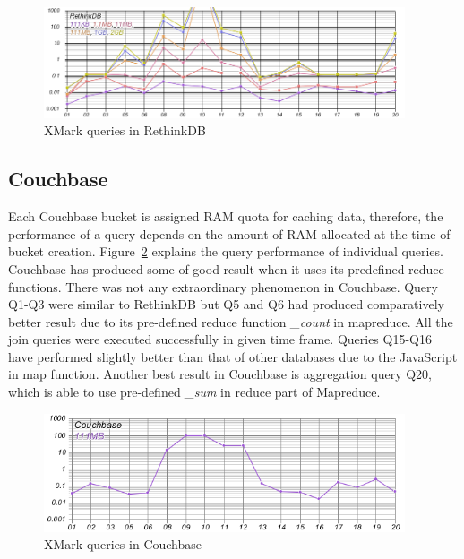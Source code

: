 \begin{figure}
	\centering
	\includegraphics[width=0.95\textwidth]{img/result/rethinkdb/rethinkdb-all}
	\caption{XMark queries in RethinkDB}
	\label{fig:xmark-result-rethinkdb-all}
\end{figure}

\subsection{Couchbase}
Each Couchbase bucket is assigned RAM quota for caching data, therefore, the performance of a query depends on the amount of RAM allocated at the time of bucket creation. Figure~\ref{fig:xmark-result-cb-all} explains the query performance of individual queries. 
Couchbase has produced some of good result when it uses its predefined reduce functions. 
There was not any extraordinary phenomenon in Couchbase.  Query Q1-Q3  were similar to RethinkDB but Q5 and Q6 had produced comparatively better result due to its pre-defined reduce function \textit{\_count} in mapreduce. All the join queries were executed successfully in given time frame. Queries Q15-Q16 have performed slightly  better than that of other databases due to the JavaScript in map function. Another best result in Couchbase is aggregation query Q20, which is able to use pre-defined \textit{\_sum} in reduce part of Mapreduce. 

\begin{figure}
	\centering
	\includegraphics[width=0.95\textwidth]{img/result/cb/cb-all}
	\caption{XMark queries in Couchbase}
	\label{fig:xmark-result-cb-all}
\end{figure}

